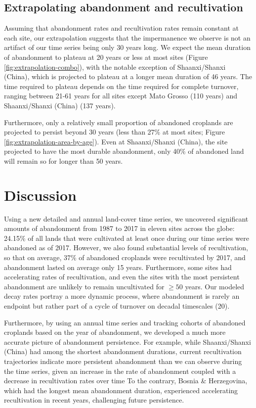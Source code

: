 \documentclass[9pt,twocolumn,twoside,]{pnas-new}
\begin{document}
\hypertarget{extrapolating-abandonment-and-recultivation}{%
\subsection{Extrapolating abandonment and recultivation}\label{extrapolating-abandonment-and-recultivation}}

Assuming that abandonment rates and recultivation rates remain constant at each site, our extrapolation suggests that the impermanence we observe is not an artifact of our time series being only 30 years long.
We expect the mean duration of abandonment to plateau at 20 years or less at most sites (Figure \ref{fig:extrapolation-combo}), with the notable exception of Shaanxi/Shanxi (China), which is projected to plateau at a longer mean duration of 46 years.
The time required to plateau depends on the time required for complete turnover, ranging between 21-61 years for all sites except Mato Grosso (110 years) and Shaanxi/Shanxi (China) (137 years).

Furthermore, only a relatively small proportion of abandoned croplands are projected to persist beyond 30 years (less than 27\% at most sites; Figure \ref{fig:extrapolation-area-by-age}).
Even at Shaanxi/Shanxi (China), the site projected to have the most durable abandonment, only 40\% of abandoned land will remain so for longer than 50 years.

\hypertarget{discussion}{%
\section{Discussion}\label{discussion}}

Using a new detailed and annual land-cover time series, we uncovered significant amounts of abandonment from 1987 to 2017 in eleven sites across the globe: 24.15\% of all lands that were cultivated at least once during our time series were abandoned as of 2017.
However, we also found substantial levels of recultivation, so that on average, 37\% of abandoned croplands were recultivated by 2017, and abandonment lasted on average only 15 years.
Furthermore, some sites had accelerating rates of recultivation, and even the sites with the most persistent abandonment are unlikely to remain uncultivated for \(\geq50\) years.
Our modeled decay rates portray a more dynamic process, where abandonment is rarely an endpoint but rather part of a cycle of turnover on decadal timescales (20).

Furthermore, by using an annual time series and tracking cohorts of abandoned croplands based on the year of abandonment, we developed a much more accurate picture of abandonment persistence.
For example, while Shaanxi/Shanxi (China) had among the shortest abandonment durations, current recultivation trajectories indicate more persistent abandonment than we can observe during the time series, given an increase in the rate of abandonment coupled with a decrease in recultivation rates over time
To the contrary, Bosnia \& Herzegovina, which had the longest mean abandonment duration, experienced accelerating recultivation in recent years, challenging future persistence.
\end{document}
